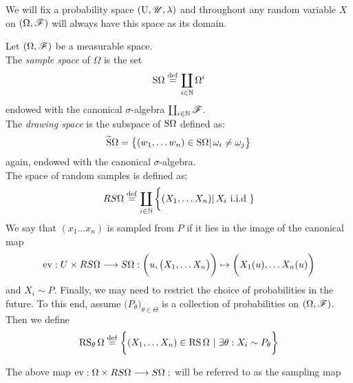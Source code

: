 \begin{convention}\label{conv:prob_univ}
We will fix a probability space $(\textrm{U}, \r{U},\lambda)$ and throughout any random variable $X$ on $(\Omega,\r{F})$ will always have this space as its domain.
\end{convention}

\begin{definition}\label{prob:def:sampling}
Let $(\Omega, \r{F})$ be a measurable space.\\
The \emph{sample space} of $\Omega$ is the set 
\[
\textrm{S} \Omega\stackrel{\operatorname{def}}{=} \coprod_{i \in \mathbb{N}}\Omega^i
\]
endowed with the canonical $\sigma$-algebra $\coprod_{i \in \d{N}} \r{F}$.\\
The \emph{drawing space} is the subspace of $\textrm{S} \Omega$ defined as:
\[
\widetilde{\textrm{S}} \Omega = \big\{ (w_1,\ldots w_n) \in \textrm{S} \Omega \vert \, \omega_i\neq \omega_j \big\}
\]
again, endowed with the canonical $\sigma$-algebra.\\
The space of random samples is defined as:
\[
RS\Omega\stackrel{\operatorname{def}}{=}  \coprod_{i \in \mathbb{N}} \bigg\{(X_1,\ldots X_n)\vert \, X_i \textrm{ i.i.d }\}
\] 
We say that $(x_1\ldots x_n)$ is sampled from $P$ if it lies in the image of the canonical map
\[
\operatorname{ev}: U\times RS\Omega\longrightarrow S\Omega: \bigg(u, \big(X_1,\ldots X_n\big)\bigg)\mapsto \bigg(X_1(u),\ldots X_n(u)\bigg)
\]
and $X_i\sim P$.
Finally, we may need to restrict the choice of probabilities in the future. To this end, assume $\big(P_\theta\big)_{\theta \in \Theta}$ is a collection of probabilities on $(\Omega,\r{F})$. Then we define
\[
\operatorname{RS}_\theta \Omega \stackrel{\operatorname{def}}{=} \bigg\{( X_1,\ldots X_n) \in \operatorname{RS}\Omega\,\,\vert \,\, \exists \theta: X_i\sim P_\theta \bigg\}
\]
\end{definition}


\begin{remark}\label{rem:prob_sampling-map}
The above map $\operatorname{ev}: \Omega\times RS\Omega\longrightarrow S\Omega: $
will be referred to as the sampling map
\end{remark}

